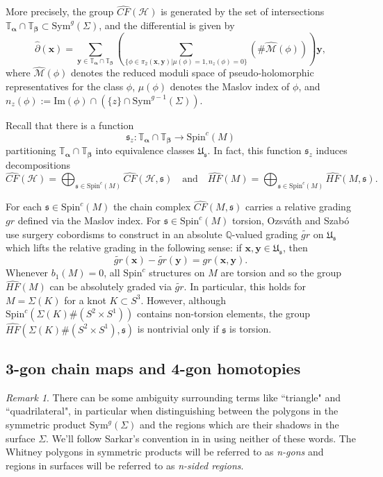 \documentclass[11pt]{article}
\theoremstyle{plain} \newtheorem{thm}{Theorem}[subsection]
\theoremstyle{plain} \newtheorem{cor}[thm]{Corollary}
\theoremstyle{plain} \newtheorem{prop}[thm]{Proposition}
\theoremstyle{plain} \newtheorem{conj}[thm]{Conjecture}
\theoremstyle{plain} \newtheorem{lem}[thm]{Lemma}
\theoremstyle{definition} \newtheorem{df}[thm]{Definition}
\theoremstyle{remark} \newtheorem{rmk}[thm]{Remark}
\theoremstyle{remark} \newtheorem{obs}[thm]{Observation}
\newcommand{\DBCs}[1]{\Sigma(#1)\#(S^{2}\times S^{1})}
\newcommand{\DBC}[1]{\Sigma(#1)}
\newcommand{\h}{\mathcal{H}}
\newcommand{\tld}[1]{\widetilde{#1}}
\newcommand{\OS}{Ozsv\'ath and Szab\'o }
\newcommand{\Symg}{\text{Sym}^{g}(\Sigma)}
\newcommand{\HFM}{\widehat{HF}(M)}
\newcommand{\Us}{\mathfrak{U}_{\mathfrak{s}}}
\newcommand{\HFxs}[1]{\widehat{HF}(\DBCs{#1}, \mathfrak{s})}
\newcommand{\ba}{\boldsymbol{\alpha}}
\newcommand{\bb}{\boldsymbol{\beta}}
\newcommand{\Ta}{\mathbb{T}_{\ba}}
\newcommand{\Tb}{\mathbb{T}_{\bb}}
\newcommand{\bx}{\mathbf{x}}
\newcommand{\by}{\mathbf{y}}
\begin{document}
More precisely, the group $\widehat{CF}(\h)$ is generated by the set of intersections $\Ta \cap \Tb \subset \Symg$, and the differential is given by
$$\widehat{\partial}(\bx) =
\displaystyle\sum_{\by \in \Ta \cap \Tb} \left( \displaystyle\sum_{\{\phi \in \pi_{2}(\bx, \by)| \mu(\phi) = 1, n_{z}(\phi) = 0\}} \left(\# \widehat{\mathcal{M}}\left(\phi\right)\right)\right)\by,
$$
where $\widehat{\mathcal{M}}(\phi)$ denotes the reduced moduli space of pseudo-holomorphic representatives for the class $\phi$, $\mu(\phi)$ denotes the Maslov index of $\phi$, and $n_z(\phi):=\text{Im}(\phi) \cap \left( \{ z \} \cap \text{Sym}^{g-1}(\Sigma)\right).$

Recall that there is a function
\begin{equation*}
\mathfrak{s}_{z}: \Ta \cap \Tb \longrightarrow \text{Spin}^{c}(M)
\end{equation*}
partitioning $\Ta \cap \Tb$ into equivalence classes $\Us$.  In fact, this function $\mathfrak{s}_{z}$ induces decompositions
\begin{equation*}
\widehat{CF}(\h)  = \displaystyle \bigoplus_{\mathfrak{s} \in \text{Spin}^{c}(M)} \widehat{CF}(\h, \mathfrak{s}) \quad \text{and} \quad
\HFM = \displaystyle \bigoplus_{\mathfrak{s} \in \text{Spin}^{c}(M)} \widehat{HF}(M, \mathfrak{s}).
\end{equation*}

For each $\mathfrak{s} \in \text{Spin}^{c}(M)$ the chain complex $\widehat{CF}(M,\mathfrak{s})$ carries a relative grading $gr$ defined via the Maslov index.  For $\mathfrak{s} \in \text{Spin}^{c}(M)$ torsion, \OS use surgery cobordisms to construct in \cite{os:tri} an absolute $\mathbb{Q}$-valued grading $\tld{gr}$ on $\Us$ which lifts the relative grading in the following sense: if $\bx, \by \in \Us$, then
\begin{equation*}
\tld{gr}(\bx) - \tld{gr}(\by) = gr(\bx, \by). 
\end{equation*}
Whenever $b_{1}(M) = 0$, all $\text{Spin}^{c}$ structures on $M$ are torsion and so the group $\widehat{HF}(M)$ can be absolutely graded via $\tld{gr}$.  In particular, this holds for $M =\DBC{K}$ for a knot $K \subset S^{3}$.  However, although $\text{Spin}^{c}(\DBCs{K})$ contains non-torsion elements, the group $\HFxs{K}$ is nontrivial only if $\mathfrak{s}$ is torsion.  

\subsection{3-gon chain maps and 4-gon homotopies}
\label{sec:triangles}
\begin{rmk}
There can be some ambiguity surrounding terms like ``triangle" and ``quadrilateral", in particular when distinguishing between the polygons in the symmetric product $\text{Sym}^{g}(\Sigma)$ and the regions which are their shadows in the surface $\Sigma$.  We'll follow Sarkar's convention in \cite{sarkar:tri} in using neither of these words.  The Whitney polygons in symmetric products will be referred to as \textit{n-gons} and regions in surfaces will be referred to as \textit{n-sided regions}.
\end{rmk}
\end{document}
